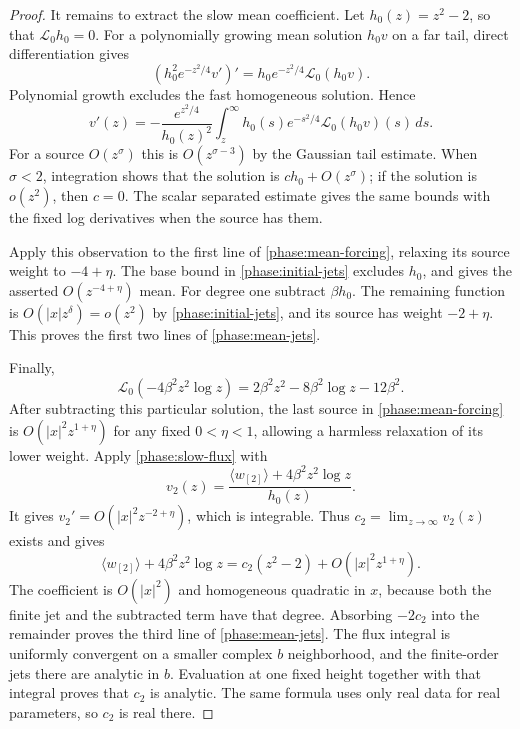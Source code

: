 \begin{proof}
It remains to extract the slow mean coefficient.  Let $h_0(z)=z^2-2$,
so that $\mathcal L_0h_0=0$.  For a polynomially growing mean solution
$h_0v$ on a far tail, direct differentiation gives
\[
 (h_0^2e^{-z^2/4}v')'=h_0e^{-z^2/4}\mathcal L_0(h_0v).
\]
Polynomial growth excludes the fast homogeneous solution.  Hence
\begin{equation}
 v'(z)=-\frac{e^{z^2/4}}{h_0(z)^2}
          \int_z^\infty h_0(s)e^{-s^2/4}\mathcal L_0(h_0v)(s)\,ds.
 \label{phase:slow-flux}
\end{equation}
For a source $O(z^\sigma)$ this is $O(z^{\sigma-3})$ by the Gaussian
tail estimate.  When $\sigma<2$, integration shows that the solution is
$c h_0+O(z^\sigma)$; if the solution is $o(z^2)$, then $c=0$.
The scalar separated estimate gives the same bounds with the fixed log
derivatives when the source has them.

Apply this observation to the first line of \eqref{phase:mean-forcing},
relaxing its source weight to $-4+\eta$.  The base bound in
\eqref{phase:initial-jets} excludes $h_0$, and gives the asserted
$O(z^{-4+\eta})$ mean.  For degree one subtract $\beta h_0$.
The remaining function is $O(|x|z^\delta)=o(z^2)$ by
\eqref{phase:initial-jets}, and its source has weight $-2+\eta$.
This proves the first two lines of \eqref{phase:mean-jets}.

Finally,
\[
 \mathcal L_0(-4\beta^2z^2\log z)
       =2\beta^2z^2-8\beta^2\log z-12\beta^2.
\]
After subtracting this particular solution, the last source in
\eqref{phase:mean-forcing} is $O(|x|^2z^{1+\eta})$ for any fixed
$0<\eta<1$, allowing a harmless relaxation of its lower weight.
Apply \eqref{phase:slow-flux} with
\[
 v_2(z)=\frac{\langle w_{[2]}\rangle+4\beta^2z^2\log z}{h_0(z)}.
\]
It gives $v_2'=O(|x|^2z^{-2+\eta})$, which is integrable.  Thus
$c_2=\lim_{z\to\infty}v_2(z)$ exists and gives
\[
 \langle w_{[2]}\rangle+4\beta^2z^2\log z
       =c_2(z^2-2)+O(|x|^2z^{1+\eta}).
\]
The coefficient is $O(|x|^2)$ and homogeneous quadratic in $x$,
because both the finite jet and the subtracted term have that degree.
Absorbing $-2c_2$ into the remainder proves the third line of
\eqref{phase:mean-jets}.  The flux integral is uniformly convergent
on a smaller complex $b$ neighborhood, and the finite-order jets there
are analytic in $b$.  Evaluation at one fixed height together with that
integral proves that $c_2$ is analytic.  The same formula uses only real
data for real parameters, so $c_2$ is real there.
\end{proof}

